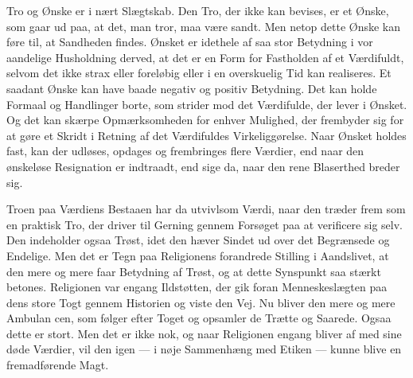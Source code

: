 \documentclass[12pt,a4paper,openany]{book}
\newcommand{\opage}[1]{\marginnote{\footnotesize\textit{[#1]}}}
\begin{document}
Tro og Ønske er i nært Slægtskab. Den Tro, der ikke kan bevises, er et
Ønske, som gaar ud paa, at det, man tror, maa være sandt. Men netop
dette Ønske kan føre til, at Sandheden findes. Ønsket er idethele af saa
stor Betydning i vor aandelige Husholdning derved, at det er en Form for
Fastholden af et Værdifuldt, selvom det ikke strax eller foreløbig eller
i en overskuelig Tid kan realiseres. Et saadant Ønske kan have baade
negativ og positiv Betydning. Det kan holde Formaal og Handlinger borte,
som strider mod det Værdifulde, der lever i Ønsket. Og det kan skærpe
Opmærksomheden for enhver Mulighed, der frembyder sig for at gøre et
Skridt i Retning af det Værdifuldes Virkeliggørelse. Naar Ønsket holdes
fast, kan der udløses, opdages og frembringes flere Værdier, end naar
den ønskeløse Resignation er indtraadt, end sige da, naar den rene
Blaserthed breder sig.

Troen paa Værdiens Bestaaen har da utvivlsom Værdi, naar den træder frem
som en praktisk Tro, der driver til Gerning gennem Forsøget paa at
verificere sig selv. Den indeholder ogsaa Trøst, idet den hæver Sindet
ud over det Begrænsede og Endelige. Men det er Tegn paa Religionens
forandrede Stilling i Aandslivet, at den mere og mere faar Betydning af
Trøst, og at dette Synspunkt saa stærkt betones. Religionen var engang
Ildstøtten, der gik foran Menneskeslægten paa dens store Togt gennem
Historien og viste den Vej. Nu bliver den mere og mere Ambulan%
\opage{223}cen, som følger efter Toget og opsamler de Trætte og Saarede.
Ogsaa dette er stort. Men det er ikke nok, og naar Religionen engang
bliver af med sine døde Værdier, vil den igen --- i nøje Sammenhæng med
Etiken --- kunne blive en fremadførende Magt.
\end{document}
